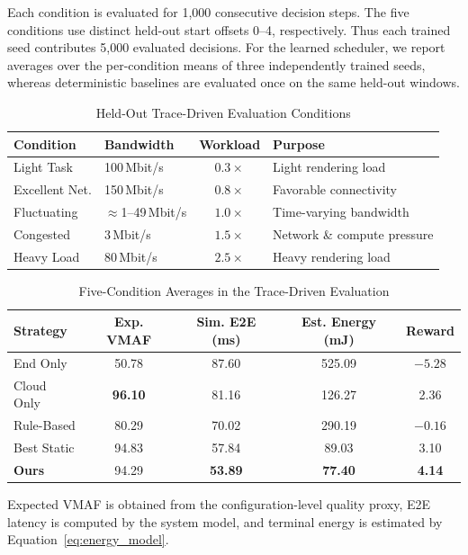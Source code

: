 \documentclass[10pt,journal,compsoc]{IEEEtran}
\begin{document}
Each condition is evaluated for 1,000 consecutive decision steps. The five conditions use distinct held-out start offsets 0--4, respectively. Thus each trained seed contributes 5,000 evaluated decisions. For the learned scheduler, we report averages over the per-condition means of three independently trained seeds, whereas deterministic baselines are evaluated once on the same held-out windows.

\begin{table}[t]
	\centering
	\caption{Held-Out Trace-Driven Evaluation Conditions}
	\label{tab:eval_conditions}
	\scriptsize
	\setlength{\tabcolsep}{2.5pt}
	\renewcommand{\arraystretch}{1.05}
	\begin{tabularx}{\columnwidth}{@{}l l c X@{}}
		\toprule
		\textbf{Condition} & \textbf{Bandwidth} & \textbf{Workload} & \textbf{Purpose} \\
		\midrule
		Light Task & 100\,Mbit/s & $0.3\times$ & Light rendering load \\
		Excellent Net. & 150\,Mbit/s & $0.8\times$ & Favorable connectivity \\
		Fluctuating & $\approx$1--49\,Mbit/s & $1.0\times$ & Time-varying bandwidth \\
		Congested & 3\,Mbit/s & $1.5\times$ & Network \& compute pressure \\
		Heavy Load & 80\,Mbit/s & $2.5\times$ & Heavy rendering load \\
		\bottomrule
	\end{tabularx}
\end{table}

\begin{table}[t]
	\centering
	\caption{Five-Condition Averages in the Trace-Driven Evaluation}
	\label{tab:quantitative}
	\footnotesize
	\setlength{\tabcolsep}{2.5pt}
	\renewcommand{\arraystretch}{1.05}
	\begin{tabular*}{\columnwidth}{@{\extracolsep{\fill}}lcccc@{}}
		\toprule
		\textbf{Strategy} & \textbf{Exp. VMAF} & \textbf{Sim. E2E (ms)} &
		\textbf{Est. Energy (mJ)} & \textbf{Reward} \\
		\midrule
		End Only & 50.78 & 87.60 & 525.09 & $-5.28$ \\
		Cloud Only & \textbf{96.10} & 81.16 & 126.27 & 2.36 \\
		Rule-Based & 80.29 & 70.02 & 290.19 & $-0.16$ \\
		Best Static & 94.83 & 57.84 & 89.03 & 3.10 \\
		\textbf{Ours} & 94.29 & \textbf{53.89} & \textbf{77.40} & \textbf{4.14} \\
		\bottomrule
	\end{tabular*}
	\par\smallskip
	\raggedright\scriptsize Expected VMAF is obtained from the configuration-level quality proxy, E2E latency is computed by the system model, and terminal energy is estimated by Equation~\ref{eq:energy_model}.\par
\end{table}
\end{document}
